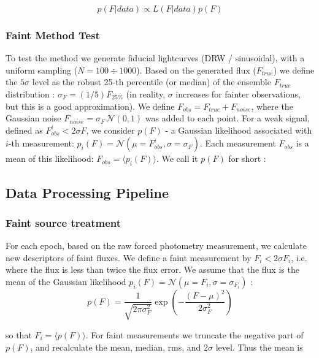 \documentclass[fleqn,usenatbib]{mnras}  %
\begin{document}
\begin{equation}
p(F|data) \propto L(F|data) p(F)
\end{equation}

\subsubsection{Faint Method Test }
To test the method we generate fiducial lightcurves (DRW / sinusoidal), with a uniform sampling ($N=100\div1000$). Based on the generated flux ($F_{true}$) we define the $5\sigma$ level as the robust 25-th percentile (or median) of the ensemble $F_{true}$ distribution :  $\sigma_{F} = (1/5)  F_{25 \%}$ (in reality, $\sigma$ increases for fainter observations, but this is a good approximation). 
\newline
We define $F_{obs} = F_{true} + F_{noise}$, where the Gaussian noise $F_{noise} = \sigma_{F}  \, \mathcal{N}(0,1)$ was added to each point. 
For a weak signal, defined as $F_{obs}^{i} < 2 \sigma{F}$, we consider $p(F)$  - a  Gaussian  likelihood associated with $i$-th measurement: $p_{i}(F) = \mathcal{N}(\mu=F_{obs}^{i}, \sigma=\sigma_{F})$. Each measurement $F_{obs}$ is a mean of this likelihood: $F_{obs} = \langle p_{i}(F) \rangle$. We call it $p(F)$  for short : 


\subsection{Data Processing Pipeline}

\subsubsection{Faint source treatment}
For each epoch, based on the raw forced photometry measurement, we calculate new descriptors of faint fluxes. We define a faint measurement by $F_{i} < 2 \sigma{F_{i}}$, i.e. where the flux is less than twice the flux error. We assume that the flux is the mean of the Gaussian likelihood  $p_{i}(F) = \mathcal{N}(\mu=F_{i}, \sigma=\sigma_{F_{i}})$ : 
\begin{equation}
p(F) = \frac{1}{\sqrt{2  \pi \sigma_{F}^{2}}} \exp{ \left(-\frac{(F-\mu)^{2}}{2\sigma_{F}^{2}}\right)}
\end{equation}

so that $F_{i} =\langle p(F) \rangle $.  For faint measurements we truncate the negative part of $p(F)$, and recalculate the mean, median, rms, and $2 \sigma$ level. Thus the mean is  
\end{document}
